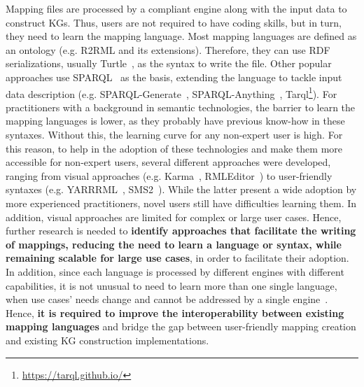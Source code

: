 

Mapping files are processed by a compliant engine along with the input data to construct KGs. 
Thus, users are not required to have coding skills, but in turn, they need to learn the mapping language. 
Most mapping languages are defined as an ontology (e.g. R2RML and its extensions). 
Therefore, they can use RDF serializations, usually Turtle~\parencite{turtle}, as the syntax to write the file.
Other popular approaches use SPARQL~\parencite{harris2013sparql} as the basis, extending the language to tackle input data description (e.g. SPARQL-Generate~\parencite{Lefrancois2017sparqlgenerate}, SPARQL-Anything~\parencite{asprino2023sparql-anything}, Tarql\footnote{\url{https://tarql.github.io/}}). 
For practitioners with a background in semantic technologies, the barrier to learn the mapping languages is lower, as they probably have previous know-how in these syntaxes. 
Without this, the learning curve for any non-expert user is high. 
For this reason, to help in the adoption of these technologies and make them more accessible for non-expert users, several different approaches were developed, ranging from visual approaches (e.g. Karma~\parencite{gupta2012karma}, RMLEditor~\parencite{heyvaert2016rmleditor}) to user-friendly syntaxes (e.g. YARRRML~\parencite{Heyvaert2018yarrrml}, SMS2~\parencite{sms2}). 
While the latter present a wide adoption by more experienced practitioners, novel users still have difficulties learning them. 
In addition, visual approaches are limited for complex or large user cases. 
Hence, further research is needed to \textbf{identify approaches that facilitate the writing of mappings, reducing the need to learn a language or syntax, while remaining scalable for large use cases}, in order to facilitate their adoption. 
In addition, since each language is processed by different engines with different capabilities, it is not unusual to need to learn more than one single language, when use cases' needs change and cannot be addressed by a single engine~\parencite{corcho2020towards}. 
Hence, \textbf{it is required to improve the interoperability between existing mapping languages} and bridge the gap between user-friendly mapping creation and existing KG construction implementations. 


